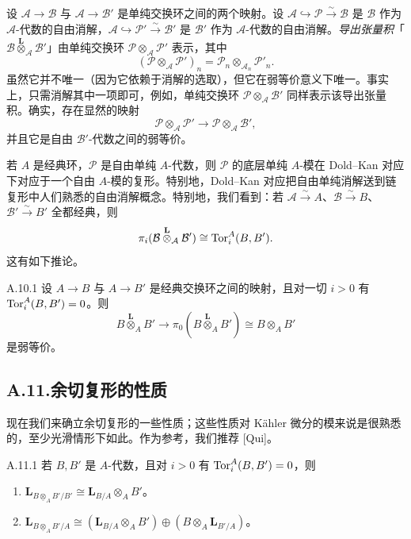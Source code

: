 设 $\mathcal A\to\mathcal B$ 与 $\mathcal A\to\mathcal B'$ 是单纯交换环之间的两个映射。设 $\mathcal A\hookrightarrow\mathcal P\xrightarrow{\sim}\mathcal B$ 是 $\mathcal B$ 作为 $\mathcal A$-代数的自由消解，$\mathcal A\hookrightarrow\mathcal P'\xrightarrow{\sim}\mathcal B'$ 是 $\mathcal B'$ 作为 $\mathcal A$-代数的自由消解。\emph{导出张量积}「$\mathcal B\overset{\mathbf L}{\otimes}_{\mathcal A}\mathcal B'$」由单纯交换环 $\mathcal P\otimes_{\mathcal A}\mathcal P'$ 表示，其中
\[
(\mathcal P\otimes_{\mathcal A}\mathcal P')_n=\mathcal P_n\otimes_{\mathcal A_n}\mathcal P'_n.
\]
虽然它并不唯一（因为它依赖于消解的选取），但它在弱等价意义下唯一。事实上，只需消解其中一项即可，例如，单纯交换环 $\mathcal P\otimes_{\mathcal A}\mathcal B'$ 同样表示该导出张量积。确实，存在显然的映射
\[
\mathcal P\otimes_{\mathcal A}\mathcal P'\to\mathcal P\otimes_{\mathcal A}\mathcal B',
\]
并且它是自由 $\mathcal B'$-代数之间的弱等价。

若 $A$ 是经典环，$\mathcal P$ 是自由单纯 $A$-代数，则 $\mathcal P$ 的底层单纯 $A$-模在 Dold--Kan 对应下对应于一个自由 $A$-模的复形。特别地，Dold--Kan 对应把自由单纯消解送到链复形中人们熟悉的自由消解概念。特别地，我们看到：若 $\mathcal A\xrightarrow{\sim}A$、$\mathcal B\xrightarrow{\sim}B$、$\mathcal B'\xrightarrow{\sim}B'$ 全都经典，则
\[
\pi_i(\mathcal B\overset{\mathbf L}{\otimes}_{\mathcal A}\mathcal B')\cong\operatorname{Tor}_i^A(B,B').
\]
这有如下推论。

\begin{cor}{A.10.1}\label{thm:a6-07-19}
设 $A\to B$ 与 $A\to B'$ 是经典交换环之间的映射，且对一切 $i>0$ 有 $\operatorname{Tor}_i^A(B,B')=0$。则
\[
B\overset{\mathbf L}{\otimes}_A B'\to\pi_0(B\overset{\mathbf L}{\otimes}_A B')\cong B\otimes_A B'
\]
是弱等价。
\end{cor}

\subsection*{A.11.\quad 余切复形的性质}

现在我们来确立余切复形的一些性质；这些性质对 Kähler 微分的模来说是很熟悉的，至少光滑情形下如此。作为参考，我们推荐 [Qui]。

\begin{prop}{A.11.1}\label{thm:a6-07-20}
若 $B,B'$ 是 $A$-代数，且对 $i>0$ 有 $\operatorname{Tor}_i^A(B,B')=0$，则
\begin{enumerate}[(1)]
\item $\mathbf L_{B\underline{\otimes}_AB'/B'}\cong\mathbf L_{B/A}\otimes_A B'$。
\item $\mathbf L_{B\underline{\otimes}_AB'/A}\cong(\mathbf L_{B/A}\otimes_A B')\oplus(B\otimes_A\mathbf L_{B'/A})$。
\end{enumerate}
\end{prop}

